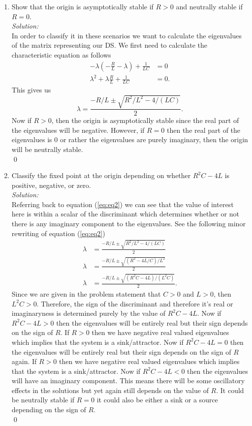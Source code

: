 \documentclass[10pt]{amsart}
\theoremstyle{nonumberplain}
\begin{document}
\begin{enumerate}[label={\bf {\arabic*}:}]
\begin{enumerate}
\item Show that the origin is asymptotically stable if $R > 0$ and neutrally stable if $R = 0$. \\
\textit{Solution:} \\
In order to classify it in these scenarios we want to calculate the eigenvalues of the matrix representing our DS.
We first need to calculate the characteristic equation as follows
\begin{align*}
-\lambda \left(- \frac R L - \lambda \right) + \frac 1 {LC} &= 0 \\
\lambda^2 + \lambda \frac R L + \frac 1 {LC} &= 0.
\end{align*}
This gives us
\begin{equation}
\lambda = \frac {-R/L \pm \sqrt{R^2/L^2 - 4/(LC)} }{2}.
\label{eq:eq2}
\end{equation}
Now if $R > 0$, then the origin is asymptotically stable since the real part of the eigenvalues will be negative.
However, if $R = 0$ then the real part of the eigenvalues is $0$ or rather the eigenvalues are purely imaginary, then the origin will be neutrally stable. \\
\qed \\

\item Classify the fixed point at the origin depending on whether $R^2C - 4L$ is positive, negative, or zero. \\
\textit{Solution:} \\
Referring back to equation (\ref{eq:eq2}) we can see that the value of interest here is within a scalar of the discriminant which determines whether or not there is any imaginary component to the eigenvalues.
See the following minor rewriting of equation (\ref{eq:eq2})
\begin{align*}
\lambda &= \frac {-R/L \pm \sqrt{R^2/L^2 - 4/(LC)} }{2} \\
\lambda &= \frac {-R/L \pm \sqrt{(R^2 - 4L/C)/L^2} }{2} \\
\lambda &= \frac {-R/L \pm \sqrt{(R^2C - 4L)/(L^2C)} }{2}.
\end{align*}
Since we are given in the problem statement that $C > 0$ and $L > 0$, then $L^2C > 0$.
Therefore, the sign of the discriminant and therefore it's real or imaginaryness is determined purely by the value of $R^2C - 4L$.
Now if $R^2C - 4L > 0$ then the eigenvalues will be entirely real but their sign depends on the sign of $R$.
If $R > 0$ then we have negative real valued eigenvalues which implies that the system is a sink/attractor.
Now if $R^2C - 4L = 0$ then the eigenvalues will be entirely real but their sign depends on the sign of $R$ again.
If $R > 0$ then we have negative real valued eigenvalues which implies that the system is a sink/attractor.
Now if $R^2C - 4L < 0$ then the eigenvalues will have an imaginary component.
This means there will be some oscillatory effects in the solutions but yet again still depends on the value of $R$.
It could be neutrally stable if $R = 0$ it could also be either a sink or a source depending on the sign of $R$. \\
\qed \\


\end{enumerate}
\end{enumerate}
\end{document}
